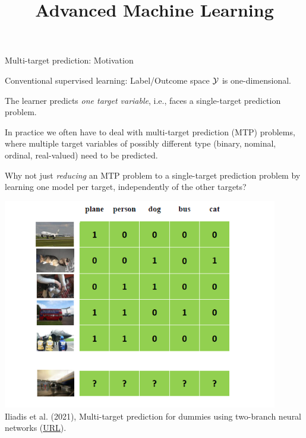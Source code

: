 \documentclass[11pt,compress,t,notes=noshow, xcolor=table]{beamer}
\title{Advanced Machine Learning}
\date{}
\begin{document}



\sloppy

\begin{vbframe}{Multi-target prediction: Motivation}
\scriptsize{
  \begin{itemize}
%  	
%		    
			\item Conventional supervised learning: Label/Outcome space $\mathcal{Y}$ is one-dimensional.
%			
			\item[$\leadsto$] The learner predicts \emph{one target variable}, i.e., faces a single-target prediction problem. 

		\begin{minipage}{0.45\textwidth}    

%
		    \item In practice we often have to deal with multi-target prediction (MTP) problems, where multiple target variables of possibly different type (binary, nominal, ordinal, real-valued) need to be predicted.
			\item Why not just \emph{reducing} an MTP problem to a single-target prediction problem by learning one model per target, independently of the other targets? 
		\end{minipage}
		\begin{minipage}{0.45\textwidth}    
			\begin{center}
				\includegraphics[width=0.9\textwidth]{figure/image_annotation} 		\tiny
				\\ Iliadis et al. (2021), Multi-target prediction for dummies using
				two-branch neural networks (\href{https://arxiv.org/abs/2104.09967}{\underline{URL}}).
			\end{center}
		\end{minipage}


\end{itemize}}
\end{vbframe}
\end{document}

